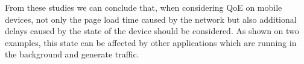 From these studies we can conclude that, when considering \gls{QoE} on mobile devices, not only the page load time caused by the network but also additional delays caused by the state of the device should be considered.
As shown on two examples, this state can be affected by other applications which are running in the background and generate traffic.

